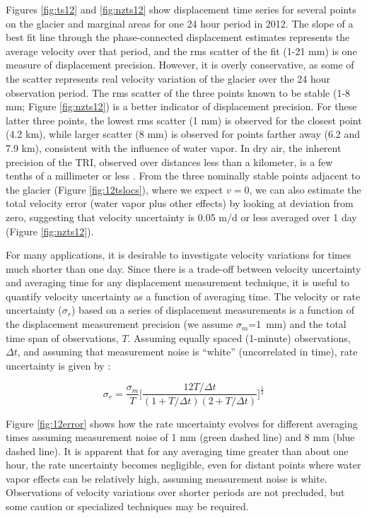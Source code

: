 Figures \ref{fig:ts12} and \ref{fig:nzts12} show displacement time series for several points on the glacier and marginal areas for one 24 hour period in 2012.   The slope of a best fit line through the phase-connected displacement estimates represents the average velocity over that period, and the rms scatter of the fit (1-21 mm) is one measure of displacement precision.   However, it is overly conservative, as some of the scatter represents real velocity variation of the glacier over the 24 hour observation period.  The rms scatter of the three points known to be stable (1-8 mm; Figure \ref{fig:nzts12}) is a better indicator of displacement precision. For these latter three points, the lowest rms scatter (1 mm) is observed for the closest point (4.2 km), while larger scatter (8 mm) is observed for points farther away (6.2 and 7.9 km), consistent with the influence of water vapor.  In dry air, the inherent precision of the TRI, observed over distances less than a kilometer, is a few tenths of a millimeter or less \citep{werner2008real}.  From the three 
nominally stable points adjacent to the glacier (Figure \ref{fig:12tslocs}), where we expect $v=0$, we can also estimate the total velocity error (water vapor plus other effects) by looking at deviation from zero, suggesting that velocity uncertainty is 0.05 m/d or less averaged over 1 day (Figure \ref{fig:nzts12}).

For many applications, it is desirable to investigate velocity variations for times much shorter than one day.  Since there is a trade-off between velocity uncertainty and averaging time for any displacement measurement technique, it is useful to quantify velocity uncertainty as a function of averaging time.   
The velocity or rate uncertainty ($\sigma_r$) based on a series of displacement measurements is a function of the displacement measurement precision (we assume $\sigma_m$=1~mm) and the total time span of observations, $T$.  Assuming equally spaced (1-minute) observations, $\Delta t$, and assuming that measurement noise is ``white'' (uncorrelated in time), rate uncertainty is given by \citep{coates1985space,dixon1991introduction,mao1999noise}: 

  
\begin{equation}\sigma_r=\frac{\sigma_m}{T}\Bigg[\frac{12T/\Delta t}{(1+T/\Delta t)(2+T/\Delta t)}\Bigg]^{\frac{1}{2}}\end{equation}
 

Figure \ref{fig:12error} shows how the rate uncertainty evolves for different averaging times assuming measurement noise of 1 mm (green dashed line) and 8 mm (blue dashed line).  It is apparent that for any averaging time greater than about one hour, the rate uncertainty becomes negligible, even for distant points where water vapor effects can be relatively high, assuming measurement noise is white.   Observations of velocity variations over shorter periods are not precluded, but some caution or specialized techniques may be required.  

